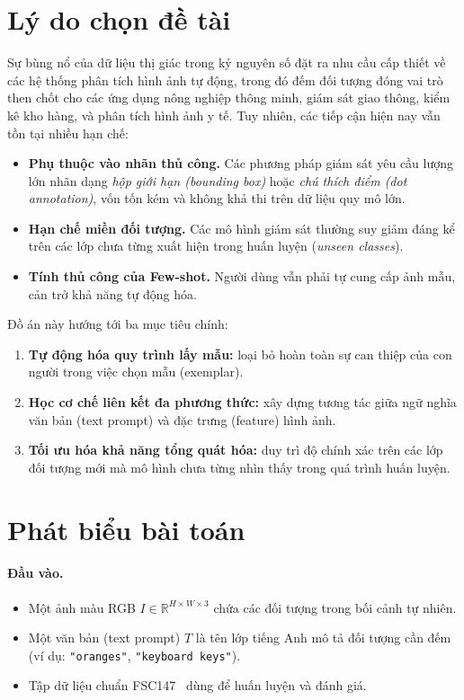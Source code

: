 \documentclass[a4paper,12pt]{report}
\numberwithin{figure}{chapter}
\numberwithin{table}{chapter}
\begin{document}
\section{Lý do chọn đề tài}
Sự bùng nổ của dữ liệu thị giác trong kỷ nguyên số đặt ra nhu cầu cấp thiết về các hệ thống phân tích hình ảnh tự động, trong đó đếm đối tượng đóng vai trò then chốt cho các ứng dụng nông nghiệp thông minh, giám sát giao thông, kiểm kê kho hàng, và phân tích hình ảnh y tế. Tuy nhiên, các tiếp cận hiện nay vẫn tồn tại nhiều hạn chế:

\begin{itemize}
    \item \textbf{Phụ thuộc vào nhãn thủ công.} Các phương pháp giám sát yêu cầu lượng lớn nhãn dạng \textit{hộp giới hạn (bounding box)} hoặc \textit{chú thích điểm (dot annotation)}, vốn tốn kém và không khả thi trên dữ liệu quy mô lớn.
    \item \textbf{Hạn chế miền đối tượng.} Các mô hình giám sát thường suy giảm đáng kể trên các lớp chưa từng xuất hiện trong huấn luyện (\textit{unseen classes}).
    \item \textbf{Tính thủ công của Few-shot.} Người dùng vẫn phải tự cung cấp ảnh mẫu, cản trở khả năng tự động hóa.
\end{itemize}
Đồ án này hướng tới ba mục tiêu chính:

\begin{enumerate}
    \item \textbf{Tự động hóa quy trình lấy mẫu:} loại bỏ hoàn toàn sự can thiệp của con người trong việc chọn mẫu (exemplar).
    \item \textbf{Học cơ chế liên kết đa phương thức:} xây dựng tương tác giữa ngữ nghĩa văn bản (text prompt) và đặc trưng (feature) hình ảnh.
    \item \textbf{Tối ưu hóa khả năng tổng quát hóa:} duy trì độ chính xác trên các lớp đối tượng mới mà mô hình chưa từng nhìn thấy trong quá trình huấn luyện.
\end{enumerate}

\section{Phát biểu bài toán}
\label{sec:problem-statement}

\paragraph{Đầu vào.}
\begin{itemize}
    \item Một ảnh màu RGB $I \in \mathbb{R}^{H \times W \times 3}$ chứa các đối tượng trong bối cảnh tự nhiên.
    \item Một văn bản (text prompt) $T$ là tên lớp tiếng Anh mô tả đối tượng cần đếm (ví dụ: \texttt{"oranges"}, \texttt{"keyboard keys"}).
    \item Tập dữ liệu chuẩn FSC147~\cite{ranjan2021fsc147} dùng để huấn luyện và đánh giá.
\end{itemize}
\end{document}
